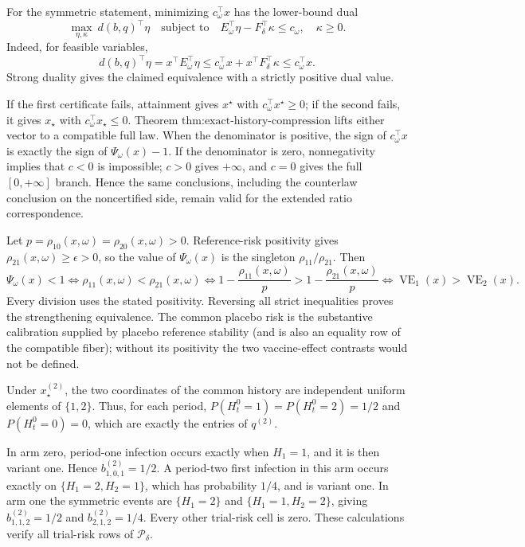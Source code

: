 For the symmetric statement, minimizing \(c_\omega^\top x\) has the lower-bound dual
\[
\max_{\eta,\kappa}\ d(b,q)^\top\eta
\quad\text{subject to}\quad
E_\omega^\top\eta-F_\delta^\top\kappa\leq c_\omega,
\quad \kappa\geq0.
\]
Indeed, for feasible variables,
\[
d(b,q)^\top\eta
=x^\top E_\omega^\top\eta
\leq c_\omega^\top x+x^\top F_\delta^\top\kappa
\leq c_\omega^\top x.
\]
Strong duality gives the claimed equivalence with a strictly positive dual value.

If the first certificate fails, attainment gives \(x^\star\) with \(c_\omega^\top x^\star\geq0\); if the second fails, it gives \(x_\star\) with \(c_\omega^\top x_\star\leq0\).  Theorem \(\text{thm:exact-history-compression}\) lifts either vector to a compatible full law.  When the denominator is positive, the sign of \(c_\omega^\top x\) is exactly the sign of \(\Psi_\omega(x)-1\).  If the denominator is zero, nonnegativity implies that \(c<0\) is impossible; \(c>0\) gives \(+\infty\), and \(c=0\) gives the full \([0,+\infty]\) branch.  Hence the same conclusions, including the counterlaw conclusion on the noncertified side, remain valid for the extended ratio correspondence.

Let \(p=\rho_{10}(x,\omega)=\rho_{20}(x,\omega)>0\).  Reference-risk positivity gives \(\rho_{21}(x,\omega)\geq\epsilon>0\), so the value of \(\Psi_\omega(x)\) is the singleton \(\rho_{11}/\rho_{21}\).  Then
\[
\Psi_\omega(x)<1
\iff \rho_{11}(x,\omega)<\rho_{21}(x,\omega)
\iff 1-\frac{\rho_{11}(x,\omega)}p>1-\frac{\rho_{21}(x,\omega)}p
\iff \operatorname{VE}_1(x)>\operatorname{VE}_2(x).
\]
Every division uses the stated positivity.  Reversing all strict inequalities proves the strengthening equivalence.  The common placebo risk is the substantive calibration supplied by placebo reference stability (and is also an equality row of the compatible fiber); without its positivity the two vaccine-effect contrasts would not be defined.

Under \(x_\star^{(2)}\), the two coordinates of the common history are independent uniform elements of \(\{1,2\}\).  Thus, for each period, \(P(H_t^0=1)=P(H_t^0=2)=1/2\) and \(P(H_t^0=0)=0\), which are exactly the entries of \(q^{(2)}\).

In arm zero, period-one infection occurs exactly when \(H_1=1\), and it is then variant one.  Hence \(b^{(2)}_{1,0,1}=1/2\).  A period-two first infection in this arm occurs exactly on \(\{H_1=2,H_2=1\}\), which has probability \(1/4\), and is variant one.  In arm one the symmetric events are \(\{H_1=2\}\) and \(\{H_1=1,H_2=2\}\), giving \(b^{(2)}_{1,1,2}=1/2\) and \(b^{(2)}_{2,1,2}=1/4\).  Every other trial-risk cell is zero.  These calculations verify all trial-risk rows of \(\mathcal P_\delta\).

